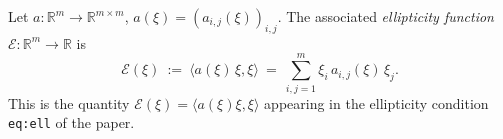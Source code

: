 \begin{definition}
Let $a:\mathbb{R}^m\to\mathbb{R}^{m\times m}$, $a(\xi)=(a_{i,j}(\xi))_{i,j}$. The associated
\emph{ellipticity function} $\mathcal{E}:\mathbb{R}^m\to\mathbb{R}$ is
$$\mathcal{E}(\xi)\ :=\ \big\langle a(\xi)\,\xi,\xi\big\rangle\ =\ \sum_{i,j=1}^m
\xi_i\,a_{i,j}(\xi)\,\xi_j .$$
This is the quantity $\mathcal{E}(\xi)=\langle a(\xi)\xi,\xi\rangle$ appearing in the ellipticity
condition \texttt{eq:ell} of the paper.
\end{definition}
